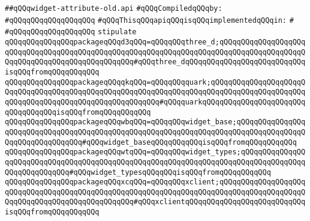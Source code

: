 \label{src/lib/x-kit/widget/old/lib/widget-attribute-old.api}
\verb|##qQQqwidget-attribute-old.api|\newline
\newline
\verb|#qQQqCompiledqQQqby:|\newline
\verb|#qQQqqQQqqQQqqQQqqQQq|\newline
\newline
\verb|#qQQqThisqQQqapiqQQqisqQQqimplementedqQQqin:|\newline
\verb|#|\newline
\verb|#qQQqqQQqqQQqqQQqqQQq|\newline
\newline
\verb|stipulate|\newline
\verb|qQQqqQQqqQQqqQQqpackageqQQqd3qQQq=qQQqqQQqthree_d;qQQqqQQqqQQqqQQqqQQqqQQqqQQqqQQqqQQqqQQqqQQqqQQqqQQqqQQqqQQqqQQqqQQqqQQqqQQqqQQqqQQqqQQqqQQqqQQqqQQqqQQqqQQqqQQqqQQqqQQq#qQQqthree_dqQQqqQQqqQQqqQQqqQQqqQQqqQQqisqQQqfromqQQqqQQqqQQq|\newline
\verb|qQQqqQQqqQQqqQQqpackageqQQqqkqQQq=qQQqqQQqquark;qQQqqQQqqQQqqQQqqQQqqQQqqQQqqQQqqQQqqQQqqQQqqQQqqQQqqQQqqQQqqQQqqQQqqQQqqQQqqQQqqQQqqQQqqQQqqQQqqQQqqQQqqQQqqQQqqQQqqQQqqQQqqQQq#qQQqquarkqQQqqQQqqQQqqQQqqQQqqQQqqQQqqQQqqQQqisqQQqfromqQQqqQQqqQQq|\newline
\verb|qQQqqQQqqQQqqQQqpackageqQQqwbqQQq=qQQqqQQqwidget_base;qQQqqQQqqQQqqQQqqQQqqQQqqQQqqQQqqQQqqQQqqQQqqQQqqQQqqQQqqQQqqQQqqQQqqQQqqQQqqQQqqQQqqQQqqQQqqQQqqQQqqQQq#qQQqwidget_baseqQQqqQQqqQQqisqQQqfromqQQqqQQqqQQq|\newline
\verb|qQQqqQQqqQQqqQQqpackageqQQqwtqQQq=qQQqqQQqwidget_types;qQQqqQQqqQQqqQQqqQQqqQQqqQQqqQQqqQQqqQQqqQQqqQQqqQQqqQQqqQQqqQQqqQQqqQQqqQQqqQQqqQQqqQQqqQQqqQQqqQQq#qQQqwidget_typesqQQqqQQqisqQQqfromqQQqqQQqqQQq|\newline
\verb|qQQqqQQqqQQqqQQqpackageqQQqxcqQQq=qQQqqQQqxclient;qQQqqQQqqQQqqQQqqQQqqQQqqQQqqQQqqQQqqQQqqQQqqQQqqQQqqQQqqQQqqQQqqQQqqQQqqQQqqQQqqQQqqQQqqQQqqQQqqQQqqQQqqQQqqQQqqQQqqQQq#qQQqxclientqQQqqQQqqQQqqQQqqQQqqQQqqQQqisqQQqfromqQQqqQQqqQQq|\newline
